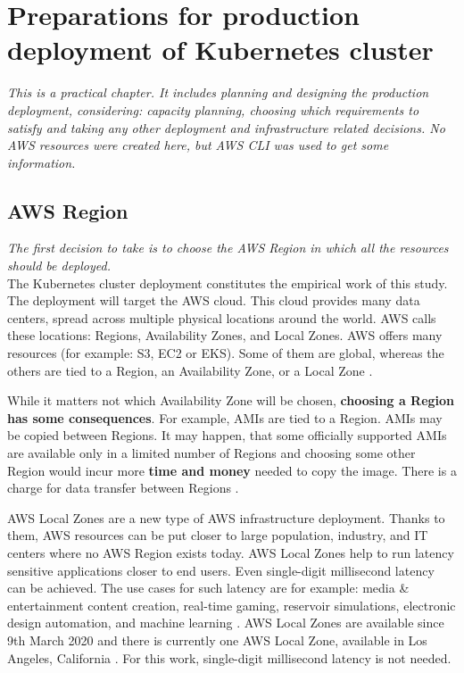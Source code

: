 \section{Preparations for production deployment of Kubernetes cluster}
\label{prep-prod}
\textit{This is a practical chapter. It includes planning and designing the production deployment, considering: capacity planning, choosing which requirements to satisfy and taking any other deployment and infrastructure related decisions. No AWS resources were created here, but \textit{AWS CLI} was used to get some information.}
~\\

\subsection{AWS Region}
\textit{The first decision to take is to choose the AWS Region in which all the resources should be deployed.}
\\

The Kubernetes cluster deployment constitutes the empirical work of this study. The deployment will target the AWS cloud. This cloud provides many data centers, spread across multiple physical locations around the world. AWS calls these locations: Regions, Availability Zones, and Local Zones. AWS offers many resources (for example: S3, EC2 or EKS). Some of them are global, whereas the others are tied to a Region, an Availability Zone, or a Local Zone \cite{az}.

While it matters not which Availability Zone will be chosen, \textbf{choosing a Region has some consequences}. For example, AMIs are tied to a Region. AMIs may be copied between Regions. It may happen, that some officially supported AMIs are available only in a limited number of Regions and choosing some other Region would incur more \textbf{time and money} needed to copy the image. There is a charge for data transfer between Regions \cite{az}.

AWS Local Zones are a new type of AWS infrastructure deployment. Thanks to them, AWS resources can be put closer to large population, industry, and IT centers where no AWS Region exists today. AWS Local Zones help to run latency sensitive applications closer to end users. Even single-digit millisecond latency can be achieved. The use cases for such latency are for example: media & entertainment content creation, real-time gaming, reservoir simulations, electronic design automation, and machine learning \cite{lz}. AWS Local Zones are available since 9th March 2020 and there is currently one AWS Local Zone, available in Los Angeles, California \cite{lz-blog}. For this work, single-digit millisecond latency is not needed.

